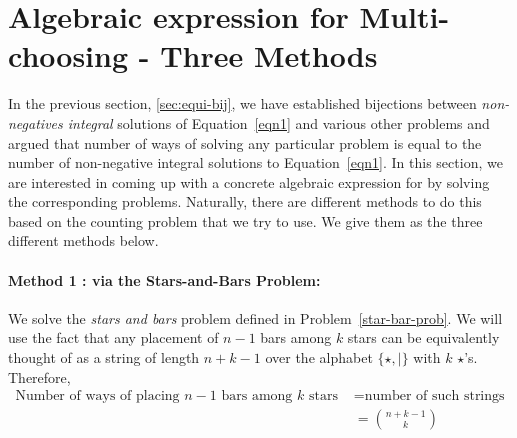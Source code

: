 \section{Algebraic expression for Multi-choosing - Three Methods}\label{alg-expr}
In the previous section, \ref{sec:equi-bij}, we have established bijections between \emph{non-negatives integral} solutions of Equation~\ref{eqn1} and various other problems and argued that number of ways of solving any particular problem is equal to the number of non-negative integral solutions to Equation~\ref{eqn1}. In this section, we are interested in coming up with a concrete algebraic expression for  by solving the corresponding problems. Naturally, there are different methods to do this based on the counting problem that we try to use. We give them as the three different methods below.

\paragraph{Method 1 : via the Stars-and-Bars Problem: } We solve the \emph{stars and bars} problem defined in Problem~\ref{star-bar-prob}. We will use the fact that any placement of $n-1$ bars among $k$ stars can be equivalently thought of as a string of length $n+k-1$ over the alphabet $\{\star,|\}$ with $k$ $\star$'s. Therefore, \begin{align*}
    \textrm{Number of ways of placing } n-1 \textrm{ bars among } k \textrm{ stars } &= \textrm{number of such strings}\\
    &= \binom{n+k-1}{k}
\end{align*}

